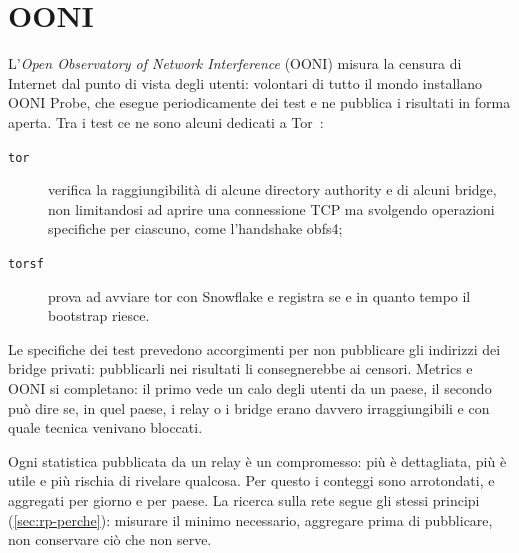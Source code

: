 \section{OONI}\label{sec:metrics-ooni}

L'\emph{Open Observatory of Network Interference} (OONI) misura la censura di Internet dal punto di vista degli utenti: volontari di tutto il mondo installano OONI Probe, che esegue periodicamente dei test e ne pubblica i risultati in forma aperta. Tra i test ce ne sono alcuni dedicati a Tor~\cite{oonitor}:
\begin{description}
  \item[\texttt{tor}] verifica la raggiungibilità di alcune directory authority e di alcuni bridge, non limitandosi ad aprire una connessione TCP ma svolgendo operazioni specifiche per ciascuno, come l'handshake obfs4;
  \item[\texttt{torsf}] prova ad avviare tor con Snowflake e registra se e in quanto tempo il bootstrap riesce.
\end{description}
Le specifiche dei test prevedono accorgimenti per non pubblicare gli indirizzi dei bridge privati: pubblicarli nei risultati li consegnerebbe ai censori. Metrics e OONI si completano: il primo vede un calo degli utenti da un paese, il secondo può dire se, in quel paese, i relay o i bridge erano davvero irraggiungibili e con quale tecnica venivano bloccati.

\begin{approfondimento}
Ogni statistica pubblicata da un relay è un compromesso: più è dettagliata, più è utile e più rischia di rivelare qualcosa. Per questo i conteggi sono arrotondati, e aggregati per giorno e per paese. La ricerca sulla rete segue gli stessi principi (\cref{sec:rp-perche}): misurare il minimo necessario, aggregare prima di pubblicare, non conservare ciò che non serve.
\end{approfondimento}

